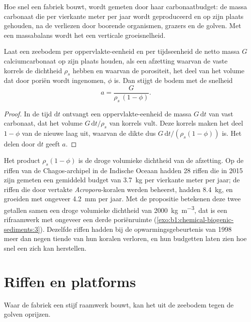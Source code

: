 Hoe snel een fabriek bouwt, wordt gemeten door haar carbonaatbudget: de massa carbonaat die per vierkante meter per jaar wordt geproduceerd en op zijn plaats gehouden, na de verliezen door boorende organismen, grazers en de golven. Met een massabalans wordt het een verticale groeisnelheid.

\begin{proposition}\label{prop:b1:chemical-biogenic-sediments:accretion}
Laat een zeebodem per oppervlakte-eenheid en per tijdseenheid de netto massa $G$ calciumcarbonaat op zijn plaats houden, als een afzetting waarvan de vaste korrels de dichtheid $\rho_s$ hebben en waarvan de porositeit, het deel van het volume dat door poriën wordt ingenomen, $\phi$ is. Dan stijgt de bodem met de snelheid
\[
a = \frac{G}{\rho_s\,(1-\phi)}.
\]
\end{proposition}

\begin{proof}
In de tijd $\mathrm dt$ ontvangt een oppervlakte-eenheid de massa $G\,\mathrm dt$ van vast carbonaat, dat het volume $G\,\mathrm dt/\rho_s$ van korrels vult. Deze korrels maken het deel $1-\phi$ van de nieuwe laag uit, waarvan de dikte dus $G\,\mathrm dt/(\rho_s(1-\phi))$ is. Het delen door $\mathrm dt$ geeft $a$.
\end{proof}

Het product $\rho_s(1-\phi)$ is de droge volumieke dichtheid van de afzetting. Op de riffen van de Chagos-archipel in de Indische Oceaan hadden 28 riffen die in 2015 zijn gemeten een gemiddeld budget van \qty{3.7}{kg}  per vierkante meter per jaar; de riffen die door vertakte \emph{Acropora}-koralen werden beheerst, hadden \qty{8.4}{kg}, en groeiden met ongeveer \qty{4.2}{mm} per jaar. Met de propositie betekenen deze twee getallen samen een droge volumieke dichtheid van \qty{2000}{kg.m^{-3}}, dat is een rifraamwerk met ongeveer een derde poriënruimte (\cref{exo:b1:chemical-biogenic-sediments:3}). Dezelfde riffen hadden bij de opwarmingsgebeurtenis van 1998 meer dan negen tiende van hun koralen verloren, en hun budgetten laten zien hoe snel een  zich kan herstellen.

\section{Riffen en platforms}\label{sec:b1:chemical-biogenic-sediments:reefs}

Waar de fabriek een stijf raamwerk bouwt, kan het uit de zeebodem tegen de golven oprijzen.


